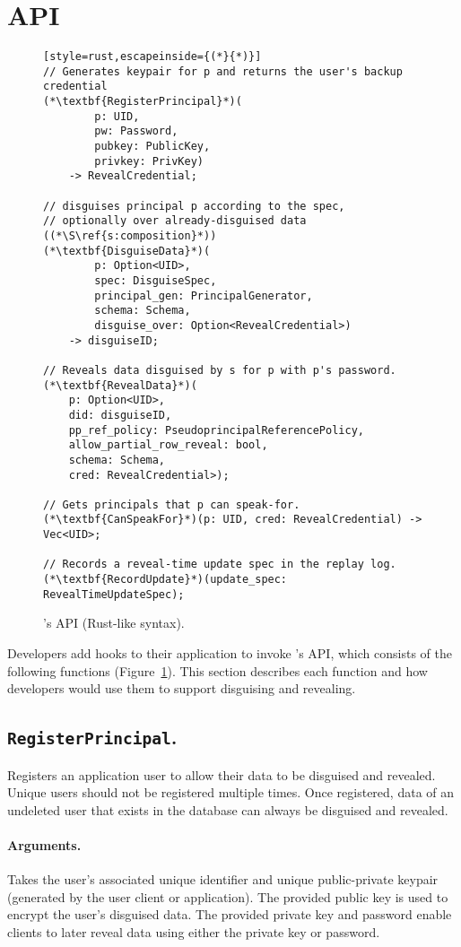 \section{\sys API}
\begin{figure}[t]
\begin{lstlisting}[style=rust,escapeinside={(*}{*)}]
// Generates keypair for p and returns the user's backup credential
(*\textbf{RegisterPrincipal}*)(
        p: UID, 
        pw: Password,
        pubkey: PublicKey, 
        privkey: PrivKey)
    -> RevealCredential;

// disguises principal p according to the spec, 
// optionally over already-disguised data ((*\S\ref{s:composition}*))
(*\textbf{DisguiseData}*)(
        p: Option<UID>, 
        spec: DisguiseSpec,
        principal_gen: PrincipalGenerator,
        schema: Schema,
        disguise_over: Option<RevealCredential>) 
    -> disguiseID;

// Reveals data disguised by s for p with p's password. 
(*\textbf{RevealData}*)(
    p: Option<UID>, 
    did: disguiseID, 
    pp_ref_policy: PseudoprincipalReferencePolicy,
    allow_partial_row_reveal: bool,
    schema: Schema,
    cred: RevealCredential>);

// Gets principals that p can speak-for.
(*\textbf{CanSpeakFor}*)(p: UID, cred: RevealCredential) -> Vec<UID>;

// Records a reveal-time update spec in the replay log.
(*\textbf{RecordUpdate}*)(update_spec: RevealTimeUpdateSpec);
\end{lstlisting}
\caption{\sys's API (Rust-like syntax).}
\label{f:api-high}
\end{figure}
%

Developers add hooks to their application to invoke \sys's API, which consists
of the following functions (Figure~\ref{f:api-high}). This section describes
each function and how developers would use them to support disguising and
revealing.

\subsection{\texttt{RegisterPrincipal}.}

    Registers an application user to allow their data to be disguised and
    revealed. Unique users should not be registered multiple times.  Once
    registered, data of an undeleted user that exists in the database can always
    be disguised and revealed.

    \paragraph{Arguments.} Takes the user's associated unique identifier and unique
    public-private keypair (generated by the user
    client or application).
    The provided public key is used to encrypt the user's disguised data. The
    provided private key and password enable clients to later reveal data using
    either the private key or password.

